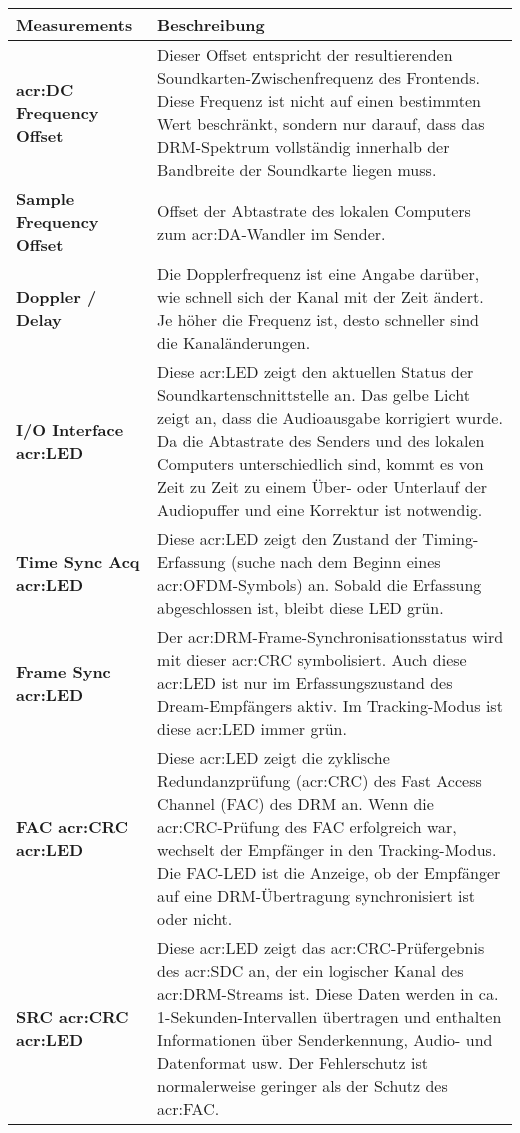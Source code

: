 \begin{table}[h]
	\begin{center}
		\begin{tabular}{|p{0.28\linewidth} | p{0.72\linewidth}|}	
			\toprule
			\textbf{Measurements} & \textbf{Beschreibung} \\
			\midrule
			\textbf{\gls{acr:DC} Frequency Offset} & Dieser Offset entspricht der resultierenden Soundkarten-Zwischenfrequenz des Frontends. Diese Frequenz ist nicht auf einen bestimmten Wert beschränkt, sondern nur darauf, dass das DRM-Spektrum vollständig innerhalb der Bandbreite der Soundkarte liegen muss.\\
			\midrule
			\textbf{Sample Frequency Offset} & Offset der Abtastrate des lokalen Computers zum \gls{acr:DA}-Wandler im Sender. \\
			\midrule
			\textbf{Doppler / Delay} & Die Dopplerfrequenz ist eine Angabe darüber, wie schnell sich der Kanal mit der Zeit ändert. Je höher die Frequenz ist, desto schneller sind die Kanaländerungen. \\
			\midrule
			\textbf{I/O Interface \gls{acr:LED}} & Diese \gls{acr:LED} zeigt den aktuellen Status der Soundkartenschnittstelle an. Das gelbe Licht zeigt an, dass die Audioausgabe korrigiert wurde. Da die Abtastrate des Senders und des lokalen Computers unterschiedlich sind, kommt es von Zeit zu Zeit zu einem Über- oder Unterlauf der Audiopuffer und eine Korrektur ist notwendig.\\
			\midrule
			\textbf{Time Sync Acq \gls{acr:LED}} &Diese \gls{acr:LED} zeigt den Zustand der Timing-Erfassung (suche nach dem Beginn eines \gls{acr:OFDM}-Symbols) an. Sobald die Erfassung abgeschlossen ist, bleibt diese LED grün.	\\
			\midrule
			\textbf{Frame Sync \gls{acr:LED}} & Der \gls{acr:DRM}-Frame-Synchronisationsstatus wird mit dieser \gls{acr:CRC} symbolisiert. Auch diese \gls{acr:LED} ist nur im Erfassungszustand des Dream-Empfängers aktiv. Im Tracking-Modus ist diese \gls{acr:LED} immer grün.\\
			\midrule
			\textbf{FAC \gls{acr:CRC} \gls{acr:LED}} & Diese \gls{acr:LED} zeigt die zyklische Redundanzprüfung (\gls{acr:CRC}) des Fast Access Channel (FAC) des DRM an. Wenn die \gls{acr:CRC}-Prüfung des FAC erfolgreich war, wechselt der Empfänger in den Tracking-Modus. Die FAC-LED ist die Anzeige, ob der Empfänger auf eine DRM-Übertragung synchronisiert ist oder nicht. \\
			\midrule
			\textbf{SRC \gls{acr:CRC} \gls{acr:LED}} & 	Diese \gls{acr:LED} zeigt das \gls{acr:CRC}-Prüfergebnis des \gls{acr:SDC} an, der ein logischer Kanal des \gls{acr:DRM}-Streams ist. Diese Daten werden in ca. 1-Sekunden-Intervallen übertragen und enthalten Informationen über Senderkennung, Audio- und Datenformat usw. Der Fehlerschutz ist normalerweise geringer als der Schutz des \gls{acr:FAC}. \\

\end{tabular}
\end{center}
\end{table}
